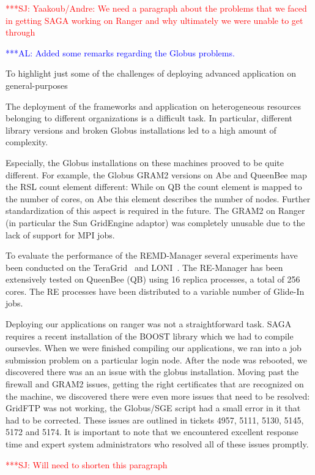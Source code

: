 \documentclass[conference,final]{IEEEtran}
\newcommand{\alnote}[1]{ {\textcolor{blue} { ***AL: #1 }}}
\newcommand{\jhanote}[1]{ {\textcolor{red} { ***SJ: #1 }}}
\newcommand{\alnote}[1]{}
\newcommand{\jhanote}[1]{}
\begin{document}
\jhanote{Yaakoub/Andre: We need a paragraph about the problems that we
  faced in getting SAGA working on Ranger and why ultimately we were
  unable to get through}

\alnote{Added some remarks regarding the Globus problems.}

To highlight just some of the challenges of deploying advanced
application on general-purposes 

The deployment of the frameworks and application on heterogeneous
resources belonging to different organizations is a difficult task. In
particular, different library versions and broken Globus installations
led to a high amount of complexity.

Especially, the Globus installations on these machines prooved to be
quite different.  For example, the Globus GRAM2 versions on Abe and
QueenBee map the RSL count element different: While on QB the count
element is mapped to the number of cores, on Abe this element
describes the number of nodes. Further standardization of this aspect
is required in the future. The GRAM2 on Ranger (in particular the Sun
GridEngine adaptor) was completely unusable due to the lack of support
for MPI jobs.

To evaluate the performance of the REMD-Manager several experiments
have been conducted on the TeraGrid~\cite{teragrid} and
LONI~\cite{loni}. The RE-Manager has been extensively tested on
QueenBee (QB) using 16 replica processes, a total of 256 cores.  The
RE processes have been distributed to a variable number of Glide-In
jobs.

Deploying our applications on ranger was not a straightforward task.
SAGA requires a recent installation of the BOOST library which we had
to compile oursevles. When we were finished compiling our
applications, we ran into a job submission problem on a particular
login node. After the node was rebooted, we discovered there was an an
issue with the globus installation. Moving past the firewall and GRAM2
issues, getting the right certificates that are recognized on the
machine, we discovered there were even more issues that need to be
resolved: GridFTP was not working, the Globus/SGE script had a small
error in it that had to be corrected. These issues are outlined in
tickets 4957, 5111, 5130, 5145, 5172 and 5174. It is important to note
that we encountered excellent response time and expert system
administrators who resolved all of these issues promptly.

\jhanote{Will need to shorten this paragraph}
\end{document}

